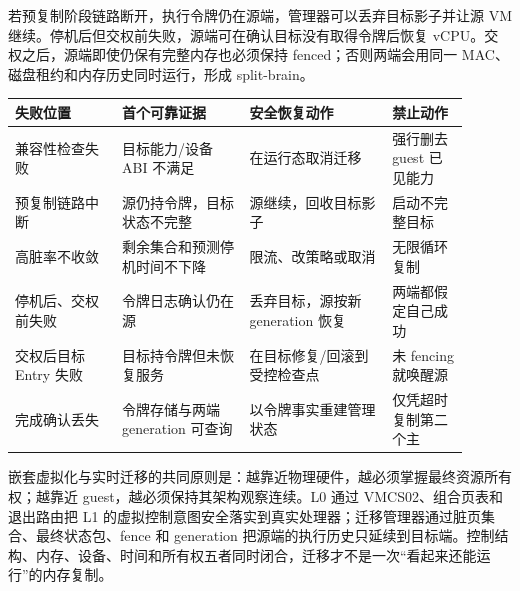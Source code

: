 
若预复制阶段链路断开，执行令牌仍在源端，管理器可以丢弃目标影子并让源 VM 继续。停机后但交权前失败，源端可在确认目标没有取得令牌后恢复 vCPU。交权之后，源端即使仍保有完整内存也必须保持 fenced；否则两端会用同一 MAC、磁盘租约和内存历史同时运行，形成 split-brain。

\begin{longtable}{L{0.21\linewidth}L{0.25\linewidth}L{0.29\linewidth}L{0.15\linewidth}}
\toprule
失败位置 & 首个可靠证据 & 安全恢复动作 & 禁止动作 \\
\midrule
兼容性检查失败 & 目标能力/设备 ABI 不满足 & 在运行态取消迁移 & 强行删去 guest 已见能力 \\\tablerowrule
预复制链路中断 & 源仍持令牌，目标状态不完整 & 源继续，回收目标影子 & 启动不完整目标 \\\tablerowrule
高脏率不收敛 & 剩余集合和预测停机时间不下降 & 限流、改策略或取消 & 无限循环复制 \\\tablerowrule
停机后、交权前失败 & 令牌日志确认仍在源 & 丢弃目标，源按新 generation 恢复 & 两端都假定自己成功 \\\tablerowrule
交权后目标 Entry 失败 & 目标持令牌但未恢复服务 & 在目标修复/回滚到受控检查点 & 未 fencing 就唤醒源 \\\tablerowrule
完成确认丢失 & 令牌存储与两端 generation 可查询 & 以令牌事实重建管理状态 & 仅凭超时复制第二个主 \\
\bottomrule
\end{longtable}

嵌套虚拟化与实时迁移的共同原则是：越靠近物理硬件，越必须掌握最终资源所有权；越靠近 guest，越必须保持其架构观察连续。L0 通过 VMCS02、组合页表和退出路由把 L1 的虚拟控制意图安全落实到真实处理器；迁移管理器通过脏页集合、最终状态包、fence 和 generation 把源端的执行历史只延续到目标端。控制结构、内存、设备、时间和所有权五者同时闭合，迁移才不是一次“看起来还能运行”的内存复制。
